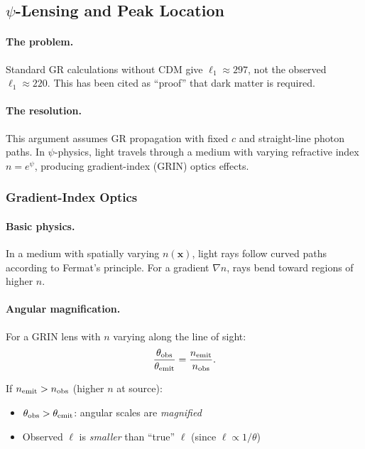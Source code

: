 \subsection{$\psi$-Lensing and Peak Location}\label{app:psi-lensing}

\paragraph{The problem.}
Standard GR calculations without CDM give $\ell_1 \approx 297$, not the observed $\ell_1 \approx 220$. This has been cited as ``proof'' that dark matter is required.

\paragraph{The resolution.}
This argument assumes GR propagation with fixed $c$ and straight-line photon paths. In $\psi$-physics, light travels through a medium with varying refractive index $n = e^\psi$, producing gradient-index (GRIN) optics effects.

\subsubsection{Gradient-Index Optics}

\paragraph{Basic physics.}
In a medium with spatially varying $n(\mathbf{x})$, light rays follow curved paths according to Fermat's principle. For a gradient $\nabla n$, rays bend toward regions of higher $n$.

\paragraph{Angular magnification.}
For a GRIN lens with $n$ varying along the line of sight:
\begin{equation}
\frac{\theta_{\rm obs}}{\theta_{\rm emit}} = \frac{n_{\rm emit}}{n_{\rm obs}}.
\end{equation}

If $n_{\rm emit} > n_{\rm obs}$ (higher $n$ at source):
\begin{itemize}[nosep]
\item $\theta_{\rm obs} > \theta_{\rm emit}$: angular scales are \textit{magnified}
\item Observed $\ell$ is \textit{smaller} than ``true'' $\ell$ (since $\ell \propto 1/\theta$)
\end{itemize}

